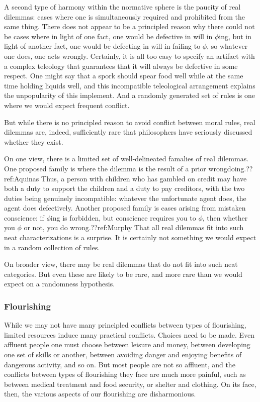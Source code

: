 A second type of harmony within the normative sphere is the paucity of real dilemmas: cases where one is simultaneously
required and prohibited from the same thing. There does not appear to be a principled reason why there could not be 
cases where in light of one fact, one would be defective in will in $\phi$ing, but in light of another fact, one 
would be defecting in will in failing to $\phi$, so whatever one does, one acts wrongly. Certainly, it is all too 
easy to specify an artifact with a complex teleology that guarantees that it will 
always be defective in some respect. One might say that a spork should spear food well while at the same time holding 
liquids well, and this incompatible teleological arrangement explains the unpopularity of this implement. And a randomly
generated set of rules is one where we would expect frequent conflict.

But while there is no principled reason to avoid conflict between moral rules, real dilemmas are, indeed, sufficiently
rare that philosophers have seriously discussed whether they exist. 

On one view, there is a limited set of well-delineated famalies of real dilemmas. One proposed family is where the 
dilemma is the result of a prior wrongdoing.??ref:Aquinas Thus, a person with children who has gambled on credit may have both a duty 
to support the children and a duty to pay creditors, with the two duties being genuinely incompatible: whatever the 
unfortunate agent does, the agent does defectively. Another proposed family is cases arising from mistaken conscience:
if $\phi$ing is forbidden, but conscience requires you to $\phi$, then whether you $\phi$ or not, you do wrong.??ref:Murphy 
That all real dilemmas fit into such neat characterizations is a surprise. It is certainly not something we would expect 
in a random collection of rules.

On broader view, there may be real dilemmas that do not fit into such neat categories. But even these are likely to be 
rare, and more rare than we would expect on a randomness hypothesis.

\subsubsection{Flourishing}
While we may not have many principled conflicts between types of flourishing, limited resources induce many 
practical conflicts. Choices need to be made.
Even affluent people one must choose between leisure and money, between developing one set of skills or another, 
between avoiding danger and enjoying benefits of dangerous activity, and so on. But most people are not so affluent,
and the conflicts between types of flourishing they face are much more painful, such as between medical treatment and food security, or shelter and clothing. On its face, then, the various aspects of our flourishing are disharmonious. 

